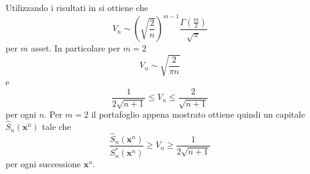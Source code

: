\documentclass[a4paper,11pt]{book}
\theoremstyle{plain}
\theoremstyle{definition}
\theoremstyle{remark}
\newcommand{\x}{\bm{x}}
\newcommand{\Sh}{\hat{S}}
\begin{document}
Utilizzando i risultati in \cite{cost1998} si ottiene che
\begin{equation*}
	V_n \sim \left(\sqrt{\frac{2}{n}}\right)^{m-1}\frac{\Gamma\left(\frac{m}{2}\right)}{\sqrt{\pi}}
\end{equation*}
per $m$ asset. In particolare per $m=2$
\begin{equation*}
	V_n\sim\sqrt{\frac{2}{\pi n}}
\end{equation*}
e
\begin{equation*}
	\frac{1}{2\sqrt{n+1}}\leq V_n\leq \frac{2}{\sqrt{n+1}}
\end{equation*}
per ogni $n$. Per $m=2$ il portafoglio appena mostrato ottiene quindi un capitale $\Sh_n(\x^n)$ tale che
\begin{equation*}
	\frac{\Sh_n(\x^n)}{S_n^*(\x^n)}\geq V_n\geq \frac{1}{2\sqrt{n+1}}
\end{equation*}
per ogni successione $\x^n$.
\end{document}
